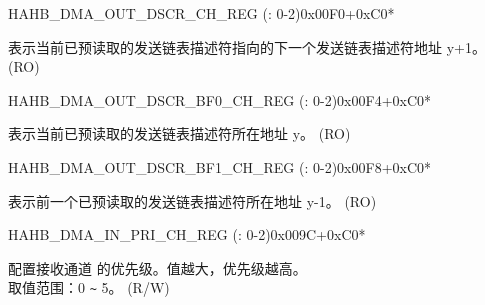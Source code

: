 \begin{register}{H}{AHB\_DMA\_OUT\_DSCR\_CH\_REG (: 0-2)}{0x00F0+0xC0*}\label{regdesc:AHBDMAOUTDSCRCHNREG}
%
\regnewline%
\begin{regdesc}\begin{reglist}
\label{fielddesc:AHBDMAOUTLINKDSCRCHN}\item [AHB\_DMA\_OUTLINK\_DSCR\_CH\regindex{n}] 表示当前已预读取的发送链表描述符指向的下一个发送链表描述符地址 y+1。 (RO)
\end{reglist}\end{regdesc}
\end{register}


\begin{register}{H}{AHB\_DMA\_OUT\_DSCR\_BF0\_CH\_REG (: 0-2)}{0x00F4+0xC0*}\label{regdesc:AHBDMAOUTDSCRBF0CHNREG}
%
\regnewline%
\begin{regdesc}\begin{reglist}
\label{fielddesc:AHBDMAOUTLINKDSCRBF0CHN}\item [AHB\_DMA\_OUTLINK\_DSCR\_BF0\_CH\regindex{n}] 表示当前已预读取的发送链表描述符所在地址 y。 (RO)
\end{reglist}\end{regdesc}
\end{register}


\begin{register}{H}{AHB\_DMA\_OUT\_DSCR\_BF1\_CH\_REG (: 0-2)}{0x00F8+0xC0*}\label{regdesc:AHBDMAOUTDSCRBF1CHNREG}
%
\regnewline%
\begin{regdesc}\begin{reglist}
\label{fielddesc:AHBDMAOUTLINKDSCRBF1CHN}\item [AHB\_DMA\_OUTLINK\_DSCR\_BF1\_CH\regindex{n}] 表示前一个已预读取的发送链表描述符所在地址 y-1。 (RO)
\end{reglist}\end{regdesc}
\end{register}


\begin{register}{H}{AHB\_DMA\_IN\_PRI\_CH\_REG (: 0-2)}{0x009C+0xC0*}\label{regdesc:AHBDMAINPRICHNREG}
%
%
\regnewline%
\begin{regdesc}\begin{reglist}
\label{fielddesc:AHBDMARXPRICHN}\item [AHB\_DMA\_RX\_PRI\_CH\regindex{n}] 配置接收通道  的优先级。值越大，优先级越高。 \\
取值范围：0 \verb+~+ 5。 (R/W)
\end{reglist}\end{regdesc}
\end{register}



